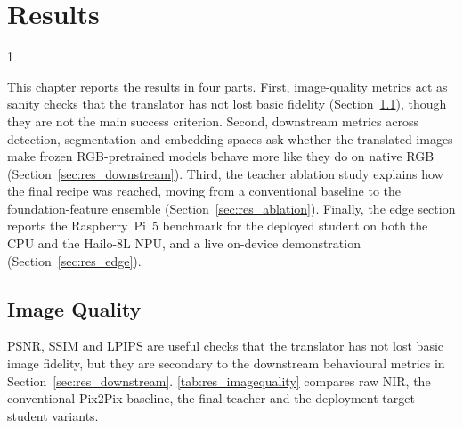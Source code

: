 \doublespacing %

\chapter{Results}
\label{ch:results}

\begin{spacing}{1} %
\minitoc %
\end{spacing} %
\thesisspacing %

This chapter reports the results in four parts. First, image-quality metrics act as sanity checks that the translator has not lost basic fidelity (Section~\ref{sec:res_imagequality}), though they are not the main success criterion. Second, downstream metrics across detection, segmentation and embedding spaces ask whether the translated images make frozen RGB-pretrained models behave more like they do on native RGB (Section~\ref{sec:res_downstream}). Third, the teacher ablation study explains how the final recipe was reached, moving from a conventional baseline to the foundation-feature ensemble (Section~\ref{sec:res_ablation}). Finally, the edge section reports the Raspberry~Pi~5 benchmark for the deployed student on both the CPU and the Hailo-8L NPU, and a live on-device demonstration (Section~\ref{sec:res_edge}).

\section{Image Quality}
\label{sec:res_imagequality}

PSNR, SSIM and LPIPS are useful checks that the translator has not lost basic image fidelity, but they are secondary to the downstream behavioural metrics in Section~\ref{sec:res_downstream}. \autoref{tab:res_imagequality} compares raw NIR, the conventional Pix2Pix baseline, the final teacher and the deployment-target student variants. 

